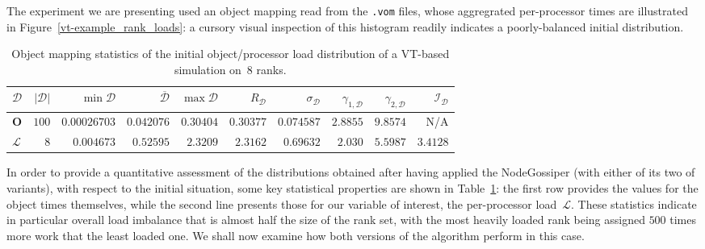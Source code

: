 The experiment we are presenting used an object mapping read from the
\texttt{.vom} files, whose aggregrated per-processor times are
illustrated in Figure~\ref{vt-example_rank_loads}: a cursory visual inspection
of this histogram readily indicates a poorly-balanced initial distribution.

\begin{table}[htb!]
\begin{center}
\begin{tabular}{@{}lrrrrrrrrr@{}}
\hline
$\mathcal{D}$ &
$\vert\mathcal{D}\vert$ &
$\min{\mathcal{D}}$ & 
$\overline{\mathcal{D}}$ & 
$\max{\mathcal{D}}$ &
$R_{\mathcal{D}}$ &
$\sigma_{\mathcal{D}}$ &
$\gamma_{1,\mathcal{D}}$ &
$\gamma_{2,\mathcal{D}}$ &
$\mathcal{I}_{\mathcal{D}}$ \\
\hline\hline
$\mathbf{O}$ &
$100$     & $0.00026703$ & $0.042076$ & $0.30404$ &
$0.30377$ & $0.074587$   &$2.8855$    & $9.8574$ &
N/A \\\hline
$\mathcal{L}$ &
$8$      & $0.004673$ & $0.52595$ & $2.3209$ &
$2.3162$ & $0.69632$  & $2.030$   & $5.5987$ &
$3.4128$\\\hline
\end{tabular}
\end{center}
\caption{\label{t:vt-example} Object mapping statistics of the initial
object/processor load distribution of a \textsf{VT}-based simulation
on~8 ranks.}
\end{table}

In order to provide a quantitative assessment of the distributions
obtained after having applied the \textsf{NodeGossiper} (with either
of its two of variants), with respect to the initial situation, some
key statistical properties are shown in Table~\ref{t:vt-example}: the 
first row provides the values for the object times themselves, while
the second line presents those for our variable of interest, the
per-processor load~$\mathcal{L}$. 
These statistics indicate in particular overall load imbalance
that is almost half the size of the rank set, with the most heavily
loaded rank being assigned $500$ times more work that the least loaded
one.
We shall now examine how both versions of the algorithm perform in
this case.

  
